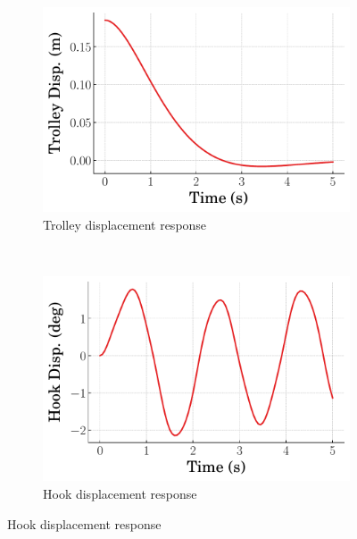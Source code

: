 %
\begin{figure}[tb]
    \centering
    \begin{subfigure}[b]{0.49\textwidth}
        \centering
        \includegraphics[width=\textwidth]{figures/figures_RL_model_based_control/time_responses_crane/dpcrane_fixed_gain/Cart_displacement_0p185_init_300000_steps.pdf}
        \caption{Trolley displacement response}
        \label{subfig_chap2:dpcrane_fixed_gain_trolley_resp}
    \end{subfigure}\\
    \hfill
    \begin{subfigure}[b]{0.49\textwidth}
        \centering
        \includegraphics[width=\textwidth]{figures/figures_RL_model_based_control/time_responses_crane/dpcrane_fixed_gain/Hook_displacement_0p185_init_300000_steps.pdf}
        \caption{Hook displacement response}
        \label{subfig_chap2:dpcrane_fixed_gain_hook_resp}

\end{subfigure}
\end{figure}
